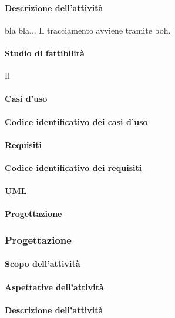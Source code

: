 \paragraph{Descrizione dell'attività}
 bla bla... \ARdocRR
 Il tracciamento avviene tramite boh.
 \paragraph{Studio di fattibilità}
 Il \RESP \SFdocRR
 \paragraph{Casi d'uso}

 \paragraph{Codice identificativo dei casi d'uso}
 
 \paragraph{Requisiti}
 
 \paragraph{Codice identificativo dei requisiti}
 
 \paragraph{UML}
 
 \paragraph{Progettazione}

\subsubsection{Progettazione}
 \paragraph{Scopo dell'attività}

 \paragraph{Aspettative dell'attività}
 
 \paragraph{Descrizione dell'attività}
 
